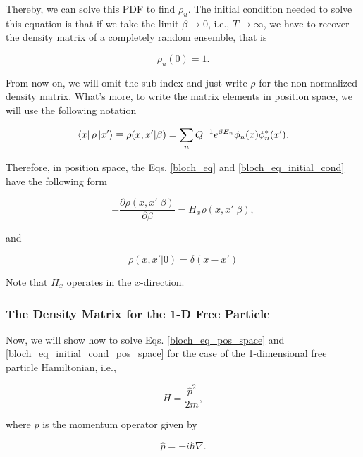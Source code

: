 \documentclass{article}
\begin{document}
Thereby, we can solve this PDF to find $\rho_u$. The initial condition needed to solve this equation is that if we take the limit $\beta \longrightarrow 0$, i.e., $T \longrightarrow \infty$, we have to recover the density matrix of a completely random ensemble, that is

\begin{equation}\label{bloch_eq_initial_cond}
    \rho_u(0) = 1.
\end{equation}

From now on, we will omit the sub-index and just write $\rho$ for the non-normalized density matrix. What's more, to write the matrix elements in position space, we will use the following notation

\begin{equation}
    \bra{x} \rho \ket{x'} \equiv \rho(x, x' | \beta) = \sum_{n} Q^{-1} e^{\beta E_{n}} \phi_n (x) \phi_{n}^{*} (x').
\end{equation}

Therefore, in position space, the Eqs. \ref{bloch_eq} and \ref{bloch_eq_initial_cond} have the following form

\begin{equation}\label{bloch_eq_pos_space}
    - \frac{\partial \rho(x, x' | \beta)}{\partial \beta} = H_{x} \rho(x, x' | \beta),
\end{equation}

and

\begin{equation}\label{bloch_eq_initial_cond_pos_space}
    \rho(x, x' | 0) = \delta(x-x')
\end{equation}

Note that $H_{x}$ operates in the $x$-direction.

\subsubsection{The Density Matrix for the 1-D Free Particle}
Now, we will show how to solve Eqs. \ref{bloch_eq_pos_space} and \ref{bloch_eq_initial_cond_pos_space} for the case of the 1-dimensional free particle Hamiltonian, i.e.,

\begin{equation}
    H = \frac{\hat{p}^{2}}{2m},
\end{equation}

where $\hat{p}$ is the momentum operator given by

\begin{equation}
    \hat{p} = -i\hbar \nabla.
\end{equation}
\end{document}
